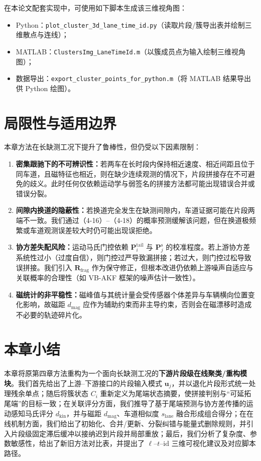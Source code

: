 \documentclass{xdupgthesis}
\begin{document}
在本论文配套实现中，可使用如下脚本生成该三维视角图：
\begin{itemize}
	\item Python：\texttt{plot\_cluster\_3d\_lane\_time\_id.py}（读取片段/簇导出表并绘制三维散点与连线）；
	\item MATLAB：\texttt{ClustersImg\_LaneTimeId.m}（以簇成员点为输入绘制三维视角图）；
	\item 数据导出：\texttt{export\_cluster\_points\_for\_python.m}（将 MATLAB 结果导出供 Python 绘图）。
\end{itemize}

\section{局限性与适用边界}
\label{sec:limitations_zh}
本章方法在长缺测工况下提升了鲁棒性，但仍受以下因素限制：
\begin{enumerate}
	\item \textbf{密集跟驰下的不可辨识性：}若两车在长时段内保持相近速度、相近间距且位于同车道，且磁特征也相近，则在缺少连续观测的情况下，片段拼接存在不可避免的歧义。此时任何仅依赖运动学与弱签名的拼接方法都可能出现错误合并或错误分裂。
	\item \textbf{间隙内换道的隐蔽性：}若换道完全发生在缺测间隙内，车道证据可能在片段两端不一致。我们通过（4-16）--（4-18）的概率预测缓解该问题，但在换道极频繁或车道观测误差较大时仍可能出现误拒绝。
	\item \textbf{协方差失配风险：}运动马氏门控依赖 $\mathbf{P}_i^{\mathrm{tail}}$ 与 $\mathbf{P}_j^{\mathrm{s}}$ 的校准程度。若上游协方差系统性过小（过度自信），则门控过严导致漏拼接；若过大，则门控过松导致误拼接。我们引入 $\mathbf{R}_{\mathrm{frag}}$ 作为保守修正，但根本改进仍依赖上游噪声自适应与关联概率的合理性（如 VB-AKF 框架的噪声估计一致性）。%
	\item \textbf{磁统计的非平稳性：}磁峰值与其统计量会受传感器个体差异与车辆横向位置变化影响，故磁距 $d_{\mathrm{mag}}$ 应作为辅助约束而非主导约束，否则会在磁漂移时造成不必要的轨迹碎片化。
\end{enumerate}

\section*{本章小结}
本章将原第四章方法重构为一个面向长缺测工况的\textbf{下游片段级在线聚类/重构模块}。我们首先给出了上游--下游接口的片段输入模式 $\mathbf{u}_j$，并以退化片段形式统一处理残余单点；随后将簇状态 $C_i$ 重新定义为尾端状态摘要，使拼接判别与“可延拓尾端”的目标一致；在关联评分方面，我们推导了基于尾端预测与协方差传播的运动感知马氏评分 $d_{\mathrm{kin}}$，并与磁距 $d_{\mathrm{mag}}$、车道相似度 $s_{\mathrm{lane}}$ 融合形成组合得分；在在线机制方面，我们给出了初始化、合并/更新、分裂纠错与能量式删除规则，并引入片段级固定滞后缓冲以接纳迟到片段并局部重放；最后，我们分析了复杂度、参数敏感性，给出了新旧方法对比表，并提出了 $\ell$--$t$--$\mathrm{id}$ 三维可视化建议及对应脚本路径。
\end{document}
